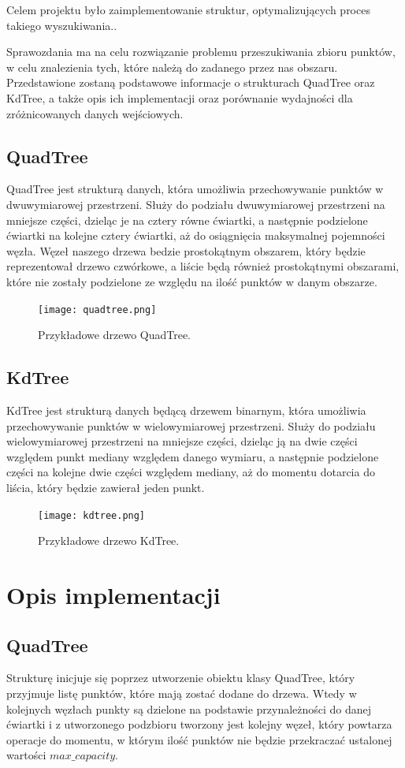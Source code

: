 \documentclass{lab}
\begin{document}
Celem projektu było zaimplementowanie struktur, optymalizujących proces takiego wyszukiwania..

Sprawozdania ma na celu rozwiązanie problemu przeszukiwania zbioru punktów, w celu znalezienia tych, które należą do zadanego przez nas obszaru. 
Przedstawione zostaną podstawowe informacje o strukturach QuadTree oraz KdTree, a także opis ich implementacji oraz porównanie wydajności dla zróżnicowanych danych wejściowych.

\subsection{QuadTree}
QuadTree jest strukturą danych, która umożliwia przechowywanie punktów w dwuwymiarowej przestrzeni. 
Służy do podziału dwuwymiarowej przestrzeni na mniejsze części, dzieląc je na cztery równe ćwiartki, a następnie podzielone ćwiartki na kolejne cztery ćwiartki, aż do osiągnięcia maksymalnej pojemności węzła.
Węzeł naszego drzewa bedzie prostokątnym obszarem, który będzie reprezentował drzewo czwórkowe, a liście będą również prostokątnymi obszarami, które nie zostały podzielone ze względu na ilość punktów w danym obszarze.
\begin{figure}[H]
  \centering
  \texttt{[image: quadtree.png]}
  \caption{Przykładowe drzewo QuadTree.}
  \label{fig:quadtree}
\end{figure}

\subsection{KdTree}
KdTree jest strukturą danych będącą drzewem binarnym, która umożliwia przechowywanie punktów w wielowymiarowej przestrzeni.
Służy do podziału wielowymiarowej przestrzeni na mniejsze części, dzieląc ją na dwie części względem punkt mediany względem danego wymiaru, 
a następnie podzielone części na kolejne dwie części względem mediany, aż do momentu dotarcia do liścia, który będzie zawierał jeden punkt.
\begin{figure}[H]
  \centering
  \texttt{[image: kdtree.png]}
  \caption{Przykładowe drzewo KdTree.}
  \label{fig:kdtree}
\end{figure}

\section{Opis implementacji}
\subsection{QuadTree}
Strukturę inicjuje się poprzez utworzenie obiektu klasy QuadTree, który przyjmuje listę punktów, które mają zostać dodane do drzewa.
Wtedy w kolejnych węzłach punkty są dzielone na podstawie przynależności do danej ćwiartki i z utworzonego podzbioru tworzony jest kolejny węzeł, 
który powtarza operacje do momentu, w którym ilość punktów nie będzie przekraczać ustalonej wartości $max\_capacity$.
\end{document}

